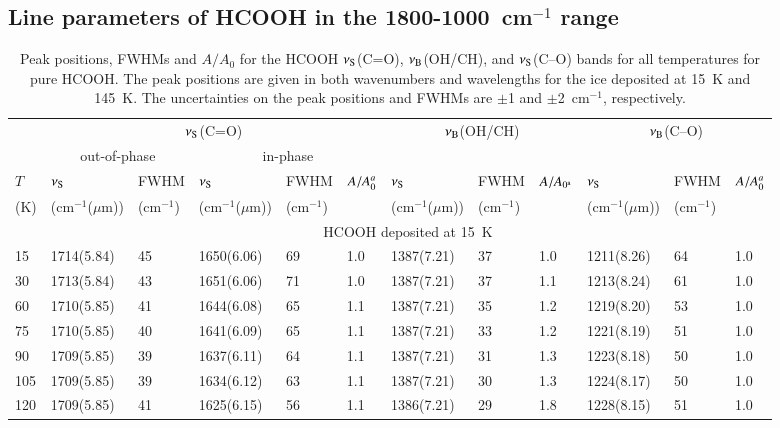 \documentclass{aa}
\begin{document}
\Online
\begin{appendix}
\section{Line parameters of HCOOH in the 1800-1000~cm$^{-1}$ range}
\begin{table*}
\caption{Peak positions, FWHMs and $A/A_0$ for the HCOOH $\nu_{\rm
S}$(C=O), $\nu_{\rm B}$(OH/CH), and $\nu_{\rm S}$(C--O) bands for all
temperatures for pure HCOOH. The peak positions are given in both
wavenumbers and wavelengths for the ice deposited at 15~K and
145~K. The uncertainties on the peak positions and FWHMs are $\pm$1
and $\pm$2~cm$^{-1}$, respectively.}\label{pp_pure}
\begin{center}
\begin{tabular}{l|lllll|lll|lll}
\hline
\hline
             & \multicolumn{5}{c|}{$\nu_{\rm S}$(C=O)} & \multicolumn{3}{c|}{$\nu_{\rm B}$(OH/CH)} & \multicolumn{3}{c}{$\nu_{\rm B}$(C--O)}\\
             & \multicolumn{2}{c}{out-of-phase} &\multicolumn{3}{c|}{in-phase} & & & & & &\\
 $T$         & $\nu_{\rm S}$ & FWHM & $\nu_{\rm S}$ & FWHM & $A/A_{\rm 0}^{a}$ & $\nu_{\rm S}$ & FWHM & $A/A_{\rm 0^{a}}$ & $\nu_{\rm S}$ & FWHM & $A/A_{\rm 0}^{a}$ \\
 (K)           & (cm$^{-1}$($\mu$m)) & (cm$^{-1}$) & (cm$^{-1}$($\mu$m)) & (cm$^{-1}$) & &(cm$^{-1}$($\mu$m)) & (cm$^{-1}$) & & (cm$^{-1}$($\mu$m)) & (cm$^{-1}$)& \\
\hline
 & \multicolumn{11}{c}{HCOOH deposited at 15~K}\\
\hline
15           &  1714(5.84) & 45 & 1650(6.06) & 69 & 1.0 & 1387(7.21) & 37 & 1.0 & 1211(8.26) & 64 & 1.0\\ 
30           &  1713(5.84) & 43 & 1651(6.06) & 71 & 1.0 & 1387(7.21) & 37 & 1.1 & 1213(8.24) & 61 & 1.0\\ 
60           &  1710(5.85) & 41 & 1644(6.08) & 65 & 1.1 & 1387(7.21) & 35 & 1.2 & 1219(8.20) & 53 & 1.0\\ 
75           &  1710(5.85) & 40 & 1641(6.09) & 65 & 1.1 & 1387(7.21) & 33 & 1.2 & 1221(8.19) & 51 & 1.0\\ 
90           &  1709(5.85) & 39 & 1637(6.11) & 64 & 1.1 & 1387(7.21) & 31 & 1.3 & 1223(8.18) & 50 & 1.0\\ 
105          &  1709(5.85) & 39 & 1634(6.12) & 63 & 1.1 & 1387(7.21) & 30 & 1.3 & 1224(8.17) & 50 & 1.0\\ 
120          &  1709(5.85) & 41 & 1625(6.15) & 56 & 1.1 & 1386(7.21) & 29 & 1.8 & 1228(8.15) & 51 & 1.0\\ 

\end{tabular}
\end{center}
\end{table*}
\end{appendix}
\end{document}
